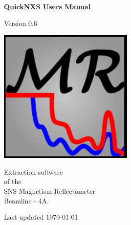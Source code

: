 \begin{titlepage}

\vspace*{0.2in}

\begin{center}
  \begin{Huge}
    \textbf{QuickNXS Users Manual}
  \end{Huge}

  \vspace*{0.3in}

  \begin{LARGE}  
    Version 0.6
  \end{LARGE}

  \vspace*{0.5in}

  \includegraphics[width=0.5\textwidth]{../../icons/logo.pdf}

  \vspace*{0.5in}
  \begin{LARGE}    
    Extraction software\\
    of the \\
    SNS Magnetism Reflectometer\\
    Beamline - 4A.
  \end{LARGE}    
    \vspace*{0.2in}
    
  \begin{large}
    Last updated \today
  \end{large}
\end{center}


 
\end{titlepage}
